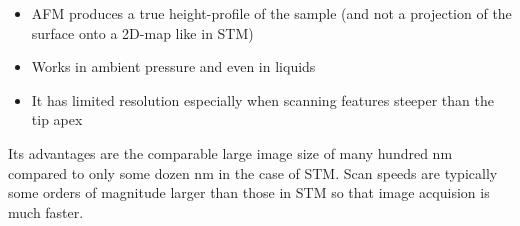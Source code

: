 \begin{itemize}
 \item AFM produces a true height-profile of the sample (and not a projection of the surface onto a 2D-map like in STM)
 \item Works in ambient pressure and even in liquids
 \item It has limited resolution especially when scanning features steeper than the tip apex
\end{itemize}

Its advantages are the comparable large image size of many hundred \si{\nm} compared to only some dozen \si{\nm} in the case of STM. Scan speeds are typically some orders of magnitude larger than those in STM so that image acquision is much faster.